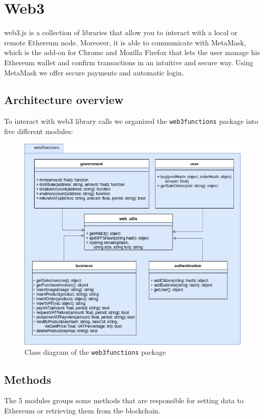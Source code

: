 \section{Web3} 
web3.js is a collection of libraries that allow you to interact with a local or remote Ethereum node. Moreover, it is able to communicate with MetaMask, which is the add-on for Chrome and Mozilla Firefox that lets the user manage his Ethereum wallet and confirm transactions in an intuitive and secure way. Using MetaMask we offer secure payments and automatic login.
\subsection{Architecture overview}
To interact with web3 library calls we organized the \texttt{web3functions} package into five different modules:
\begin{figure}[h]
	\centering
	\includegraphics[scale=0.65]{res/images/web3.png}
	\caption{Class diagram of the \texttt{web3functions} package}
\end{figure}
\subsection{Methods}

The 5 modules groups some methods that are responsible for setting data to Ethereum or retrieving them from the blockchain.

